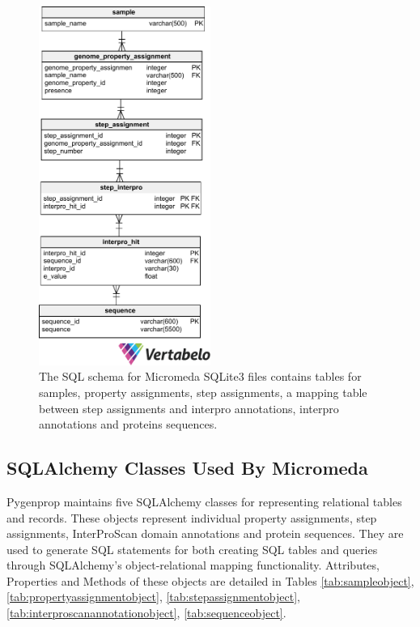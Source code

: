 \begin{figure}[!ht]
  \centering
	\includegraphics[width=0.50\textwidth]{media/micromeda_schema.pdf}
	 \caption{The SQL schema for Micromeda SQLite3 files contains tables for samples, property assignments, step assignments, a mapping table between step assignments and interpro annotations, interpro annotations and proteins sequences.}
	 \label{fig:micromedaschema}
\end{figure}

\subsection{SQLAlchemy Classes Used By Micromeda}

Pygenprop maintains five SQLAlchemy classes for representing relational tables and records. These objects represent individual property assignments, step assignments, InterProScan domain annotations and protein sequences. They are used to generate SQL statements for both creating SQL tables and queries through SQLAlchemy's object-relational mapping functionality. Attributes, Properties and Methods of these objects are detailed in Tables \ref{tab:sampleobject}, \ref{tab:propertyassignmentobject}, \ref{tab:stepassignmentobject}, \ref{tab:interproscanannotationobject}, \ref{tab:sequenceobject}.


